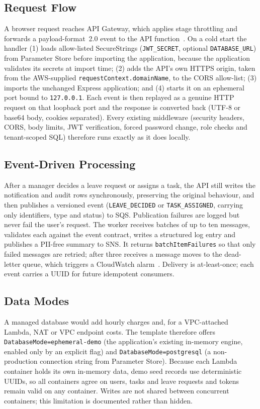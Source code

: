 \documentclass[conference]{IEEEtran}
\newcommand{\code}[1]{\texttt{\small #1}}
\begin{document}
\subsection{Request Flow}
A browser request reaches API Gateway, which applies stage throttling and forwards a
payload-format~2.0 event to the API function~\cite{aws-lambda}. On a cold start the handler (1) loads
allow-listed SecureStrings (\code{JWT\_SECRET}, optional \code{DATABASE\_URL}) from Parameter
Store before importing the application, because the application validates its secrets at
import time; (2) adds the API's own HTTPS origin, taken from the AWS-supplied
\code{requestContext.domainName}, to the CORS allow-list; (3) imports the unchanged Express
application; and (4) starts it on an ephemeral port bound to \code{127.0.0.1}. Each event is
then replayed as a genuine HTTP request on that loopback port and the response is converted
back (UTF-8 or base64 body, cookies separated). Every existing middleware (security headers,
CORS, body limits, JWT verification, forced password change, role checks and tenant-scoped SQL)
therefore runs exactly as it does locally.

\subsection{Event-Driven Processing}
After a manager decides a leave request or assigns a task, the API still writes the
notification and audit rows synchronously, preserving the original behaviour, and then
publishes a versioned event (\code{LEAVE\_DECIDED} or \code{TASK\_ASSIGNED}, carrying only
identifiers, type and status) to SQS. Publication failures are logged but never fail the
user's request. The worker receives batches of up to ten messages, validates each against
the event contract, writes a structured log entry and publishes a PII-free summary to SNS. It
returns \code{batchItemFailures} so that only failed messages are retried; after three receives
a message moves to the dead-letter queue, which triggers a CloudWatch alarm~\cite{aws-sqs}.
Delivery is at-least-once; each event carries a UUID for future idempotent consumers.

\subsection{Data Modes}
A managed database would add hourly charges and, for a VPC-attached Lambda, NAT or VPC
endpoint costs. The template therefore offers \code{DatabaseMode=ephemeral-demo} (the
application's existing in-memory engine, enabled only by an explicit flag) and
\code{DatabaseMode=postgresql} (a non-production connection string from Parameter Store).
Because each Lambda container holds its own in-memory data, demo seed records use
deterministic UUIDs, so all containers agree on users, tasks and leave requests and tokens
remain valid on any container. Writes are not shared between concurrent containers; this
limitation is documented rather than hidden.
\end{document}
